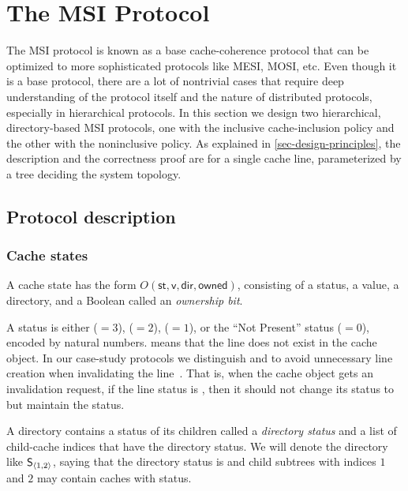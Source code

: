 \section{The MSI Protocol}
\label{sec-msi-protocol}

The MSI protocol is known as a base cache-coherence protocol that can be optimized to more sophisticated protocols like MESI, MOSI, etc.
Even though it is a base protocol, there are a lot of nontrivial cases that require deep understanding of the protocol itself and the nature of distributed protocols, especially in hierarchical protocols.
In this section we design two hierarchical, directory-based MSI protocols, one with the inclusive cache-inclusion policy and the other with the noninclusive policy.
As explained in \autoref{sec-design-principles}, the description and the correctness proof are for a single cache line, parameterized by a tree deciding the system topology.

\subsection{Protocol description}
\label{sec-msi-protocol-desc}

\subsubsection{Cache states}

A cache state has the form $O(\textsf{st}, \textsf{v}, \textsf{dir}, \textsf{owned})$, consisting of a status, a value, a directory, and a Boolean called an \emph{ownership bit}.

A status is either \stM{}($=3$), \stS{}($=2$), \stI{}($=1$), or the ``Not Present'' status (\stNP{}$=0$), encoded by natural numbers.
\stNP{} means that the line does not exist in the cache object.
In our case-study protocols we distinguish \stI{} and \stNP{} to avoid unnecessary line creation when invalidating the line~\cite{ccbook:2020}.
That is, when the cache object gets an invalidation request, if the line status is \stNP{}, then it should not change its status to \stI{} but maintain the \stNP{} status.

A directory contains a status of its children called a \emph{directory status} and a list of child-cache indices that have the directory status.
We will denote the directory like $\textsf{S}{}_{\langle 1, 2 \rangle}$, saying that the directory status is \stS{} and child subtrees with indices $1$ and $2$ may contain caches with \stS{} status.

